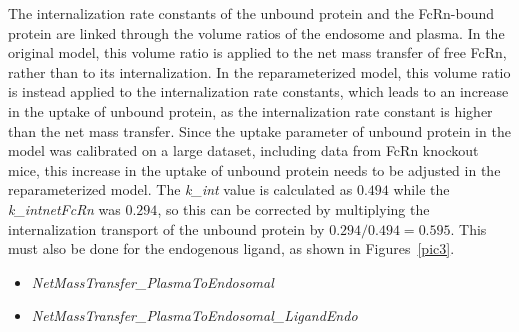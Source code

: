 \documentclass[fleqn,10pt]{physiome}
\begin{document}
The internalization rate constants of the unbound protein and the FcRn-bound protein are linked through the volume ratios of the endosome and plasma. In the original model, this volume ratio is applied to the net mass transfer of free FcRn, rather than to its internalization. In the reparameterized model, this volume ratio is instead applied to the internalization rate constants, which leads to an increase in the uptake of unbound protein, as the internalization rate constant is higher than the net mass transfer. Since the uptake parameter of unbound protein in the model was calibrated on a large dataset, including data from FcRn knockout mice, this increase in the uptake of unbound protein needs to be adjusted in the reparameterized model. The \textit{k\_int} value is calculated as $0.494$ while the \textit{k\_intnetFcRn} was $0.294$, so this can be corrected by multiplying the internalization transport of the unbound protein by $0.294/0.494=0.595$. This must also be done for the endogenous ligand, as shown in Figures~\ref{pic3}.

\begin{itemize}
    \item \textit{NetMassTransfer\_PlasmaToEndosomal}
    \item \textit{NetMassTransfer\_PlasmaToEndosomal\_LigandEndo}
\end{itemize}
\end{document}

